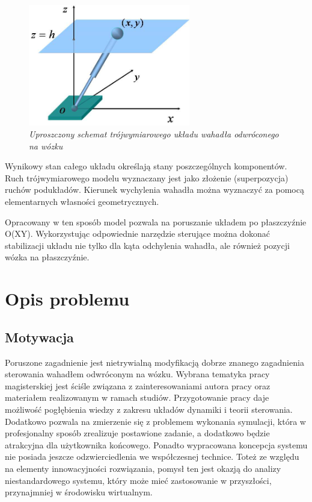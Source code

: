 \documentclass[12pt, twoside, openany]{report}
\theoremstyle{definition}
\begin{document}
\begin{figure}[H]
	\centering
		\includegraphics[width = 200pt]{3DimModel} 
		\caption{\textit{Uproszczony schemat trójwymiarowego układu wahadła odwróconego na wózku \cite{3DimModel}}}
		\label{3DimModel}
\end{figure}

Wynikowy stan całego układu określają stany poszczególnych komponentów. Ruch trójwymiarowego modelu wyznaczany jest jako złożenie (superpozycja) ruchów podukładów. Kierunek wychylenia wahadła można wyznaczyć za pomocą elementarnych własności geometrycznych. 

Opracowany w ten sposób model pozwala na poruszanie układem po płaszczyźnie O(XY). Wykorzystując odpowiednie narzędzie sterujące można dokonać stabilizacji układu nie tylko dla kąta odchylenia wahadła, ale również pozycji wózka na płaszczyźnie.

\section{Opis problemu}
\subsection{Motywacja}
Poruszone zagadnienie jest nietrywialną modyfikacją dobrze znanego zagadnienia sterowania wahadłem odwróconym na wózku. Wybrana tematyka pracy magisterskiej jest ściśle związana z zainteresowaniami autora pracy oraz materiałem realizowanym w ramach studiów. Przygotowanie pracy daje możliwość pogłębienia wiedzy z zakresu układów dynamiki i teorii sterowania. Dodatkowo pozwala na zmierzenie się z problemem wykonania symulacji, która w profesjonalny sposób zrealizuje postawione zadanie, a dodatkowo będzie atrakcyjna dla użytkownika końcowego. Ponadto wypracowana koncepcja systemu nie posiada jeszcze odzwierciedlenia we współczesnej technice. Toteż ze względu na elementy innowacyjności rozwiązania, pomysł ten jest okazją do analizy niestandardowego systemu, który może mieć zastosowanie w przyszłości, przynajmniej w środowisku wirtualnym.
\end{document}
